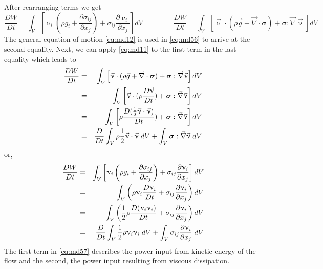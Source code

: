 After rearranging terms we get
\begin{equation}
\frac{DW}{Dt} = \int_V 
\left[ \upnu_i ( \rho g_i + \frac{\partial\sigma_{ij}}{\partial x_j}  ) 
+ \sigma_{ij} \frac{\partial \upnu_i }{\partial x_j}
\right] dV
\quad
\quad
\bigg\rvert
\quad
\quad
\frac{DW}{Dt} = \int_V 
\left[
\vec\upnu\cdot ( \rho \vec{g} + \vec\nabla\cdot {\bm \sigma})
+{\bm \sigma} : \vec\nabla\vec\upnu
\right]
dV
\label{eq:md56}
\end{equation}
The general equation of motion \eqref{eq:md12} is used in \eqref{eq:md56} 
to arrive at the second equality.
Next, we can apply \eqref{eq:md11} to the first term in the last equality which leads to
\begin{eqnarray}
\frac{DW}{Dt} 
&=& \int_V \left[ \vec\upnu\cdot ( \rho \vec{g} + \vec\nabla\cdot {\bm \sigma})
+{\bm \sigma} : \vec\nabla\vec\upnu \right] dV \nonumber\\
&=&\int_V \left[ \vec\upnu\cdot ( \rho \frac{D \vec{\upnu}}{Dt} )
+{\bm \sigma} : \vec\nabla\vec\upnu \right] dV \nonumber\\
&=& \int_V \left[ \rho \frac{D (\frac12 \vec\upnu\cdot\vec{\upnu} )}{Dt} )
+{\bm \sigma} : \vec\nabla\vec\upnu \right] dV \nonumber\\
&=&\frac{D}{Dt} \int_V  \rho \frac12 \vec\upnu\cdot\vec{\upnu}\;  dV
+\int_V {\bm \sigma} : \vec\nabla\vec\upnu \; dV 
\end{eqnarray}
or,
\begin{eqnarray}
\frac{DW}{Dt} &=& 
\int_V \left[ \upnu_i \left( \rho g_i +  \frac{\partial\sigma_{ij}}{\partial x_j}  \right) 
+ \sigma_{ij} \frac{\partial \upnu_i }{\partial x_j}  \right] dV \nonumber\\
&=& \int_V \left(\rho \upnu_i \frac{D\upnu_i}{Dt} 
+ \sigma_{ij}  \frac{\partial \upnu_i }{\partial x_j} \right) dV \nonumber\\
&=& \int_V \left(\frac12 \rho \frac{D (\upnu_i\upnu_i)}{Dt} 
+ \sigma_{ij}  \frac{\partial \upnu_i }{\partial x_j} \right) dV \nonumber\\
&=& \frac{D}{Dt} \int_V \frac12 \rho \upnu_i\upnu_i \; dV + 
\int_V   \sigma_{ij}  \frac{\partial \upnu_i }{\partial x_j} \; dV 
\label{eq:md57}
\end{eqnarray}
The first term in \eqref{eq:md57} 
describes the power input from kinetic energy of the flow and the
second, the power input resulting from viscous dissipation.


